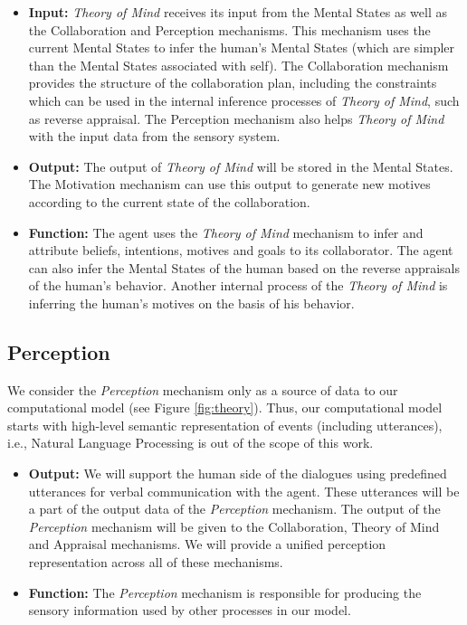 \documentclass[12pt]{report}
\begin{document}
\begin{itemize}
  \item \textbf{Input:} \textit{Theory of Mind} receives its input from the
  Mental States as well as the Collaboration and Perception mechanisms. This
  mechanism uses the current Mental States to infer the human's Mental States
  (which are simpler than the Mental States associated with self). The
  Collaboration mechanism provides the structure of the collaboration plan,
  including the constraints which can be used in the internal inference
  processes of \textit{Theory of Mind}, such as reverse appraisal. The
  Perception mechanism also helps \textit{Theory of Mind} with the input data
  from the sensory system.
  
  \item \textbf{Output:} The output of \textit{Theory of Mind} will be stored in
  the Mental States. The Motivation mechanism can use this output to generate
  new motives according to the current state of the collaboration.
  
  \item \textbf{Function:} The agent uses the \textit{Theory of Mind} mechanism
  to infer and attribute beliefs, intentions, motives and goals to its
  collaborator. The agent can also infer the Mental States of the human based on
  the reverse appraisals of the human's behavior. Another internal process of
  the \textit{Theory of Mind} is inferring the human's motives on the basis of
  his behavior.
\end{itemize}

\subsection{Perception}

We consider the \textit{Perception} mechanism only as a source of data to our
computational model (see Figure \ref{fig:theory}). Thus, our computational
model starts with high-level semantic representation of events (including
utterances), i.e., Natural Language Processing is out of the scope of this work.

\begin{itemize}
  \item \textbf{Output:} We will support the human side of the dialogues using
  predefined utterances for verbal communication with the agent. These
  utterances will be a part of the output data of the \textit{Perception}
  mechanism. The output of the \textit{Perception} mechanism will be given to the
  Collaboration, Theory of Mind and Appraisal mechanisms. We will provide a
  unified perception representation across all of these mechanisms.
  
  \item \textbf{Function:} The \textit{Perception} mechanism is responsible for
  producing the sensory information used by other processes in our model.
\end{itemize}
\end{document}
